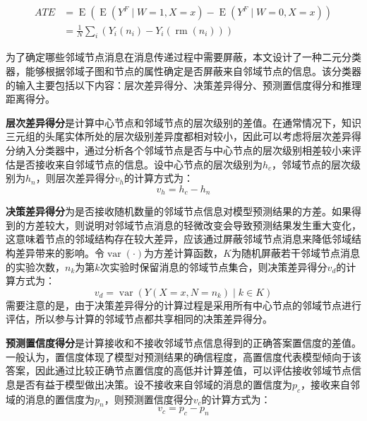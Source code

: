 \documentclass[algorithmlist, AutoFakeBold, AutoFakeSlant, figurelist, tablelist, nomlist, engineering]{seuthesix}
\begin{document}
\begin{equation}
  \begin{aligned}
    ATE & =\operatorname{E}\left(\operatorname{E}\left(Y^F \mid W=1, X=x\right)-\operatorname{E}\left(Y^F \mid W=0, X=x\right)\right) \\
    & =\frac{1}{N} \sum_i\left(Y_i(n_i)-Y_i(\operatorname{rm}(n_i))\right)
  \end{aligned}
  \label{equation_CausalInterventionATE}
\end{equation}

为了确定哪些邻域节点消息在消息传递过程中需要屏蔽，本文设计了一种二元分类器，能够根据邻域子图和节点的属性确定是否屏蔽来自邻域节点的信息。该分类器的输入主要包括以下内容：层次差异得分、决策差异得分、预测置信度得分和推理距离得分。

\textbf{层次差异得分}是计算中心节点和邻域节点的层次级别的差值。在通常情况下，知识三元组的头尾实体所处的层次级别差异度都相对较小，因此可以考虑将层次差异得分纳入分类器中，通过分析各个邻域节点是否与中心节点的层次级别相差较小来评估是否接收来自邻域节点的信息。设中心节点的层次级别为$h_c$，邻域节点的层次级别为$h_n$，则层次差异得分$v_h$的计算方式为：
\begin{equation}
  v_h = h_c - h_n
  \label{get1}
\end{equation}

\textbf{决策差异得分}为是否接收随机数量的邻域节点信息对模型预测结果的方差。如果得到的方差较大，则说明对邻域节点消息的轻微改变会导致预测结果发生重大变化，这意味着节点的邻域结构存在较大差异，应该通过屏蔽邻域节点消息来降低邻域结构差异带来的影响。令$\operatorname{var}(\cdot)$为方差计算函数，$K$为随机屏蔽若干邻域节点消息的实验次数，$n_k$为第$k$次实验时保留消息的邻域节点集合，则决策差异得分$v_d$的计算方式为：
\begin{equation}
  v_d = \operatorname{var}(Y(X=x, N=n_k) \mid k \in K)
  \label{get2}
\end{equation}
需要注意的是，由于决策差异得分的计算过程是采用所有中心节点的邻域节点进行评估，所以参与计算的邻域节点都共享相同的决策差异得分。

\textbf{预测置信度得分}是计算接收和不接收邻域节点信息得到的正确答案置信度的差值。一般认为，置信度体现了模型对预测结果的确信程度，高置信度代表模型倾向于该答案，因此通过比较正确节点置信度的高低并计算差值，可以评估接收邻域节点信息是否有益于模型做出决策。设不接收来自邻域的消息的置信度为$p_c$，接收来自邻域的消息的置信度为$p_n$，则预测置信度得分$v_c$的计算方式为：
\begin{equation}
  v_c = p_c - p_n
  \label{get3}
\end{equation}
\end{document}
